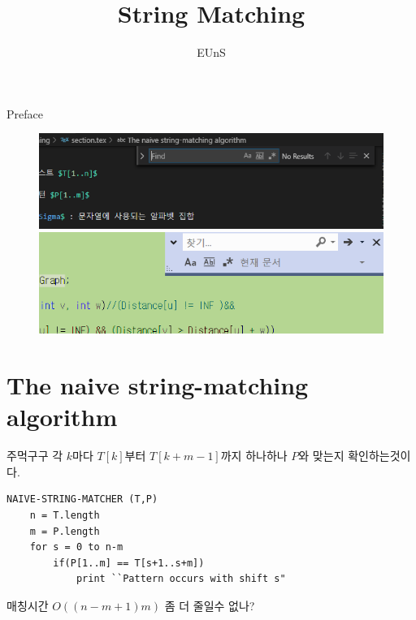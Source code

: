 \documentclass[10pt]{beamer}
\title{String Matching}
\author{EUnS}
\begin{document}
\begin{frame}
  \maketitle
\end{frame}


\begin{frame}{Preface}
    \begin{figure}[h!]
        \centering
        \includegraphics[scale=0.6]{pre1.PNG}
        \includegraphics[scale=0.6]{pre2.PNG}
    \end{figure}
\end{frame}



\section{The naive string-matching algorithm}



\begin{frame}[fragile]{주먹구구}
    각 $k$마다 $T[k]$부터 $T[k+m-1]$까지 하나하나 $P$와 맞는지 확인하는것이다.
\begin{lstlisting}[style = CStyle]
NAIVE-STRING-MATCHER (T,P)
    n = T.length
    m = P.length
    for s = 0 to n-m
        if(P[1..m] == T[s+1..s+m])
            print ``Pattern occurs with shift s"
\end{lstlisting}
\end{frame}

\begin{frame}
    매칭시간 $O((n-m+1)m)$ 좀 더 줄일수 없나?
\end{frame}
\end{document}
